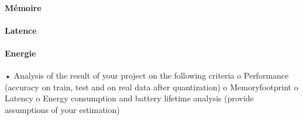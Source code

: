 \paragraph{Mémoire}
\paragraph{Latence}
\paragraph{Energie}
• Analysis of the result of your project on the following criteria
o Performance (accuracy on train, test and on real data after quantization)
o Memoryfootprint
o Latency
o Energy consumption and battery lifetime analysis (provide assumptions of your
estimation)

